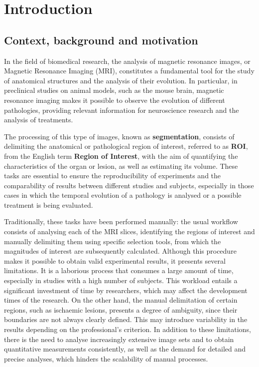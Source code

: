 \chapter*{Introduction}

\label{cap:introduction}

\section*{Context, background and motivation}

In the field of biomedical research, the analysis of magnetic resonance images, or Magnetic Resonance Imaging (MRI), constitutes a fundamental tool for the study of anatomical structures and the analysis of their evolution. In particular, in preclinical studies on animal models, such as the mouse brain, magnetic resonance imaging makes it possible to observe the evolution of different pathologies, providing relevant information for neuroscience research and the analysis of treatments. \citep{ucm_imagej_manual,saito2024preclinicalMRI}

The processing of this type of images, known as \textbf{segmentation}, consists of delimiting the anatomical or pathological region of interest, referred to as \textbf{ROI}, from the English term \textbf{Region of Interest}, with the aim of quantifying the characteristics of the organ or lesion, as well as estimating its volume. These tasks are essential to ensure the reproducibility of experiments and the comparability of results between different studies and subjects, especially in those cases in which the temporal evolution of a pathology is analysed or a possible treatment is being evaluated. \citep{ucm_imagej_manual}

Traditionally, these tasks have been performed manually: the usual workflow consists of analysing each of the MRI slices, identifying the regions of interest and manually delimiting them using specific selection tools, from which the magnitudes of interest are subsequently calculated.
Although this procedure makes it possible to obtain valid experimental results, it presents several limitations. It is a laborious process that consumes a large amount of time, especially in studies with a high number of subjects. This workload entails a significant investment of time by researchers, which may affect the development times of the research.
On the other hand, the manual delimitation of certain regions, such as ischaemic lesions, presents a degree of ambiguity, since their boundaries are not always clearly defined. This may introduce variability in the results depending on the professional's criterion.
In addition to these limitations, there is the need to analyse increasingly extensive image sets and to obtain quantitative measurements consistently, as well as the demand for detailed and precise analyses, which hinders the scalability of manual processes.
\citep{ucm_imagej_manual,veigaCanuto2022interobserverMRI,liu2022interobserverSegmentation}

